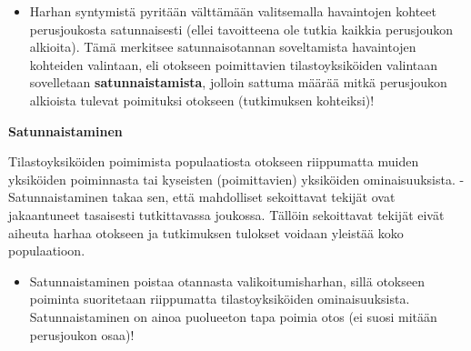 \documentclass[
]{book}
\providecommand{\tightlist}{%
  \setlength{\itemsep}{0pt}\setlength{\parskip}{0pt}}
\begin{document}
\begin{itemize}
\tightlist
\item
  Harhan syntymistä pyritään välttämään valitsemalla havaintojen kohteet perusjoukosta satunnaisesti (ellei tavoitteena ole tutkia kaikkia perusjoukon alkioita). Tämä merkitsee satunnaisotannan soveltamista havaintojen kohteiden valintaan, eli otokseen poimittavien tilastoyksiköiden valintaan sovelletaan \textbf{satunnaistamista}, jolloin sattuma määrää mitkä perusjoukon alkioista tulevat poimituksi otokseen (tutkimuksen kohteiksi)!
\end{itemize}

\begin{noteblock}{}

\textbf{Satunnaistaminen}

Tilastoyksiköiden poimimista populaatiosta otokseen riippumatta muiden yksiköiden poiminnasta tai kyseisten (poimittavien) yksiköiden ominaisuuksista.
- Satunnaistaminen takaa sen, että mahdolliset sekoittavat tekijät ovat jakaantuneet tasaisesti tutkittavassa joukossa. Tällöin sekoittavat tekijät eivät aiheuta harhaa otokseen ja tutkimuksen tulokset voidaan yleistää koko populaatioon.

\begin{itemize}
\tightlist
\item
  Satunnaistaminen poistaa otannasta valikoitumisharhan, sillä otokseen poiminta suoritetaan riippumatta tilastoyksiköiden ominaisuuksista. Satunnaistaminen on ainoa puolueeton tapa poimia otos (ei suosi mitään perusjoukon osaa)!
\end{itemize}

\end{noteblock}
\end{document}

